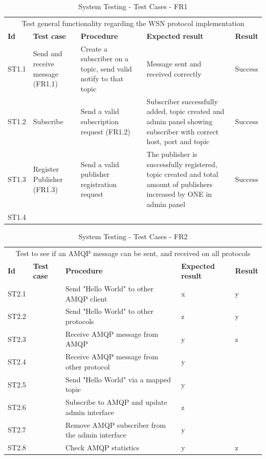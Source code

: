 \begin{table}[ht!]
\begin{tabular}{|m{1cm}|m{2cm}|m{4cm}|m{3cm}|m{1cm}|}
\hline
\rowcolor{lightgray}
\multicolumn{5}{|c|}{\textbf{FR1-10, WSN}} \\ \hline
\multicolumn{5}{|c|}{{Test general functionality regarding the WSN protocol implementation}} \\ \hline
\textbf{Id} & \textbf{Test case} & \textbf{Procedure} & \textbf{Expected result} & \textbf{Result} \\ \hline
ST1.1 & Send and receive message (FR1.1) & Create a subscriber on a topic, send valid notify to that topic & Message sent and received correctly & Success \\ \hline
ST1.2 & Subscribe & Send a valid subscription request (FR1.2) & Subscriber successfully added, topic created and admin panel showing subscriber with correct host, port and topic & Success \\ \hline
ST1.3 & Register Publisher (FR1.3) & Send a valid publisher registration request & The publisher is successfully registered, topic created and total amount of publishers increased by ONE in admin panel & Success \\ \hline
ST1.4 & & & & \\ \hline
\end{tabular}
\caption{System Testing - Test Cases - FR1}
\label{table:system-testing-cases-fr1}
\end{table}

\begin{table}[ht!]
\begin{tabular}{|m{1cm}|m{2cm}|m{4cm}|m{3cm}|m{1cm}|}
\hline
\rowcolor{lightgray}
\multicolumn{5}{|c|}{\textbf{FR2, AMQP}} \\ \hline
\multicolumn{5}{|c|}{{Test to see if an AMQP message can be sent, and received on all protocols}} \\ \hline
\textbf{Id} & \textbf{Test case} & \textbf{Procedure} & \textbf{Expected result} & \textbf{Result} \\ \hline
ST2.1 &&Send "Hello World" to other AMQP client & x & y \\ \hline
ST2.2 &&Send "Hello World" to other protocols &z&y \\ \hline
ST2.3 &&Receive AMQP message from AMQP &y&z \\ \hline
ST2.4 &&Receive AMQP message from other protocol &y& \\ \hline
ST2.5 &&Send "Hello World" via a mapped topic &y& \\ \hline
ST2.6 &&Subscribe to AMQP and update admin interface &z& \\ \hline
ST2.7 &&Remove AMQP subscriber from the admin interface &y& \\ \hline
ST2.8 &&Check AMQP statistics &y&z \\ \hline
\end{tabular}
\caption{System Testing - Test Cases - FR2}
\label{table:system-testing-cases-fr2}
\end{table}


